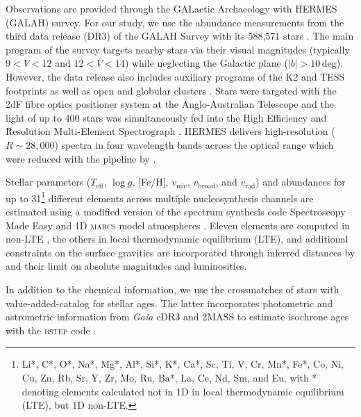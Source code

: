 \documentclass[fleqn,usenatbib]{mnras}
\newcommand{\Gaia}{\textit{Gaia}\xspace} %
\begin{document}
Observations are provided through the GALactic Archaeology with HERMES (GALAH) survey. For our study, we use the abundance measurements from the third data release (DR3) of the GALAH Survey with its 588,571 stars \citep{Buder2021}. The main program of the survey targets nearby stars via their visual magnitudes (typically $9 < V < 12$ and $12 < V < 14$) while neglecting the Galactic plane ($\vert b \vert > 10\,\mathrm{deg}$). However, the data release also includes auxiliary programs of the K2 and TESS footprints \citep{Sharma2018, Sharma2019} as well as open and globular clusters \cite[for more details see][]{Buder2021}. Stars were targeted with the 2dF fibre optics positioner system at the Anglo-Australian Telescope \citep{Heijmans2012, Farrell2014} and the light of up to 400 stars was simultaneously fed into the High Efficiency and Resolution Multi-Element Spectrograph \citep[HERMES,][]{Barden2010, Sheinis2015}. HERMES delivers high-resolution ($R \sim 28,000$) spectra in four wavelength bands across the optical range which were reduced with the pipeline by \citep{Kos2017}.

Stellar parameters ($T_\text{eff}$, $\log g$, [Fe/H], $v_\text{mic}$, $v_\text{broad}$, and $v_\text{rad}$) and abundances for up to 31\footnote{Li*, C*, O*, Na*, Mg*, Al*, Si*, K*, Ca*, Sc, Ti, V, Cr, Mn*, Fe*, Co, Ni, Cu, Zn, Rb, Sr, Y, Zr, Mo, Ru, Ba*, La, Ce, Nd, Sm, and Eu, with * denoting elements calculated not in 1D in local thermodynamic equilibrium (LTE), but 1D non-LTE.} different elements across multiple nucleosynthesis channels are estimated using a modified version of the spectrum synthesis code Spectroscopy Made Easy \citep[\textsc{sme}][]{Valenti1996, Piskunov2017} and 1D \textsc{marcs} model atmospheres \citep{Gustafsson2008}. Eleven elements are computed in non-LTE \citep{Amarsi2020}, the others in local thermodynamic equilibrium (LTE), and additional constraints on the surface gravities are incorporated through inferred distances by \citet{BailerJones2021} and their limit on absolute magnitudes and luminosities.

In addition to the chemical information, we use the crossmatches of stars with value-added-catalog for stellar ages. The latter incorporates photometric and astrometric information from \Gaia eDR3 \citep{Lindegren2021a} and 2MASS \citep{Skrutskie2006} to estimate isochrone ages with the \textsc{bstep} code \citep{Sharma2018}.
\end{document}
